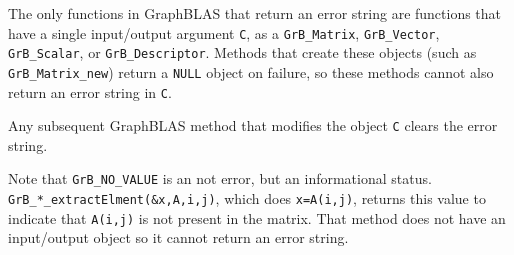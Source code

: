 \documentclass[12pt]{article}
\begin{document}
{The only functions in GraphBLAS that return an error string are functions that
have a single input/output argument \verb'C', as a \verb'GrB_Matrix',
\verb'GrB_Vector', \verb'GrB_Scalar', or \verb'GrB_Descriptor'. Methods that
create these objects (such as \verb'GrB_Matrix_new') return a \verb'NULL'
object on failure, so these methods cannot also return an error string in
\verb'C'.

Any subsequent GraphBLAS method that modifies the object \verb'C' clears the
error string.

Note that \verb'GrB_NO_VALUE' is an not error, but an informational status.
\verb'GrB_*_extractElment(&x,A,i,j)', which does \verb'x=A(i,j)', returns this
value to indicate that \verb'A(i,j)' is not present in the matrix.  That
method does not have an input/output object so it cannot return an error
string.





}
\end{document}
